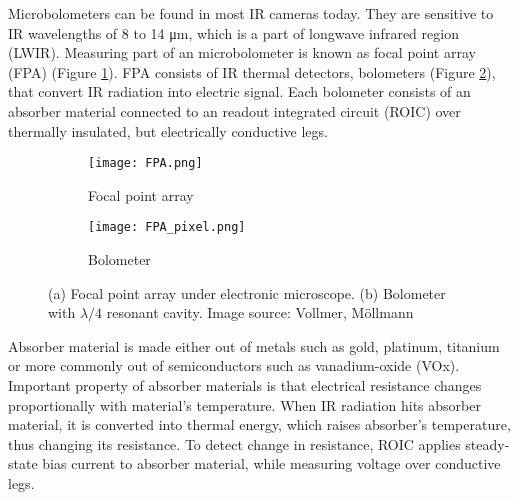Microbolometers can be found in most IR cameras today\cite{thermal_book}. 
They are sensitive to IR wavelengths of 8 to 14 \si{\micro\meter}, which is a part of longwave infrared region (LWIR)\cite{thermal_book}.
Measuring part of an microbolometer is known as focal point array (FPA) (Figure \ref{FPA}).
FPA consists of IR thermal detectors, bolometers (Figure \ref{FPA_pixel}), that convert IR radiation into electric signal.
Each bolometer consists of an absorber material connected to an readout integrated circuit (ROIC) over thermally insulated, but electrically conductive legs\cite{thermal_article}.
\newline

\begin{figure}[h]
    \begin{subfigure}{0.5\textwidth}
        \centering
        \texttt{[image: FPA.png]} 
        \caption{Focal point array}
        \label{FPA}
    \end{subfigure}
    \begin{subfigure}{0.5\textwidth}
        \centering
        \texttt{[image: FPA\_pixel.png]}
        \caption{Bolometer}
        \label{FPA_pixel}
    \end{subfigure}

    \caption{(a) Focal point array under electronic microscope. (b) Bolometer with $\lambda /4$ resonant cavity. Image source: Vollmer, Möllmann\cite{thermal_book}}
    \label{FPA_microbolo}
\end{figure}

Absorber material is made either out of metals such as gold, platinum, titanium or more commonly out of semiconductors such as vanadium-oxide (VOx)\cite{thermal_article}.
Important property of absorber materials is that electrical resistance changes proportionally with material's temperature\cite{thermal_book}.
When IR radiation hits absorber material, it is converted into thermal energy, which raises absorber's temperature, thus changing its resistance.
To detect change in resistance, ROIC applies steady-state bias current to absorber material, while measuring voltage over conductive legs\cite{thermal_book}. 

